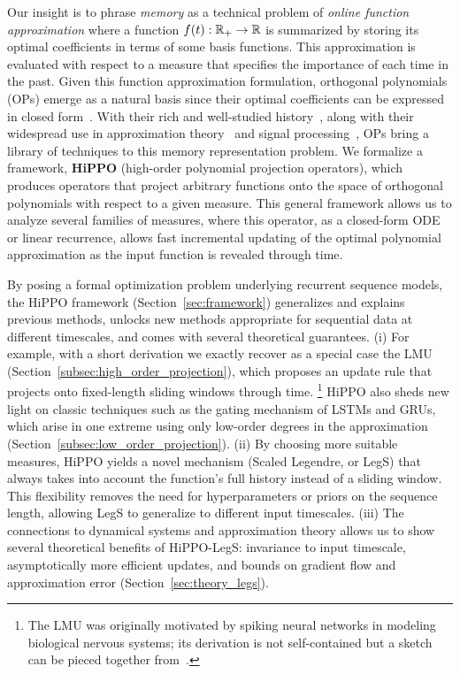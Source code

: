   Our insight is to phrase \emph{memory} as a technical problem of \emph{online
    function approximation} where a function $f(t) : \mathbb{R}_+ \to \mathbb{R}$ is summarized by storing its
  optimal coefficients in terms of some basis functions.
  This approximation is evaluated with respect to a measure that
  specifies the importance of each time in the past.
  Given this function approximation formulation, orthogonal polynomials (OPs) emerge as a natural basis since
  their optimal coefficients can be expressed in closed form~\citep{chihara}.
  With their rich and well-studied history~\citep{szego}, along with their
  widespread use in approximation theory~\citep{trefethen2019approximation} and
  signal processing~\citep{proakis2001digital}, OPs bring a library of
  techniques to this memory representation problem.
  We formalize a framework, \textbf{HiPPO} (high-order polynomial projection
  operators), which produces operators that project arbitrary functions onto the space of
  orthogonal polynomials with respect to a given measure.
  This general framework allows us to analyze several families of measures,
  where this operator, as a closed-form ODE or linear recurrence, allows fast incremental updating of the optimal polynomial approximation as the input function is revealed through time.


  By posing a formal optimization problem underlying recurrent sequence models,
  the HiPPO framework (Section~\ref{sec:framework})
  generalizes and explains previous methods, unlocks new methods
  appropriate for sequential data at different timescales, and comes with several theoretical guarantees.
  (i) For example, with a short derivation we exactly recover as a special case
  the LMU~\citep{voelker2019legendre} (Section~\ref{subsec:high_order_projection}), which proposes an update rule that projects
  onto fixed-length sliding windows through time.%
  \footnote{The LMU was originally motivated by spiking neural networks in
    modeling biological nervous systems; its derivation is not self-contained but a
    sketch can be pieced together from~\citep{voelker2019legendre,voelker2018improving,voelker2019dynamical}.}
  HiPPO also sheds new light on classic techniques such as the gating mechanism
  of LSTMs and GRUs, which arise in one extreme using only low-order degrees in
  the approximation (Section~\ref{subsec:low_order_projection}).
  (ii)
    By choosing more suitable measures, HiPPO yields a novel mechanism (Scaled Legendre, or LegS) that
    always takes into account the function's full history instead of a sliding window.
    This flexibility removes the need for hyperparameters or priors on the sequence length,
    allowing LegS to generalize to different input timescales.
    (iii)
    The connections to dynamical systems and approximation theory
    allows us to show several theoretical benefits of HiPPO-LegS:
    invariance to input timescale, asymptotically more efficient updates, and
    bounds on gradient flow and approximation error (Section~\ref{sec:theory_legs}).
    

